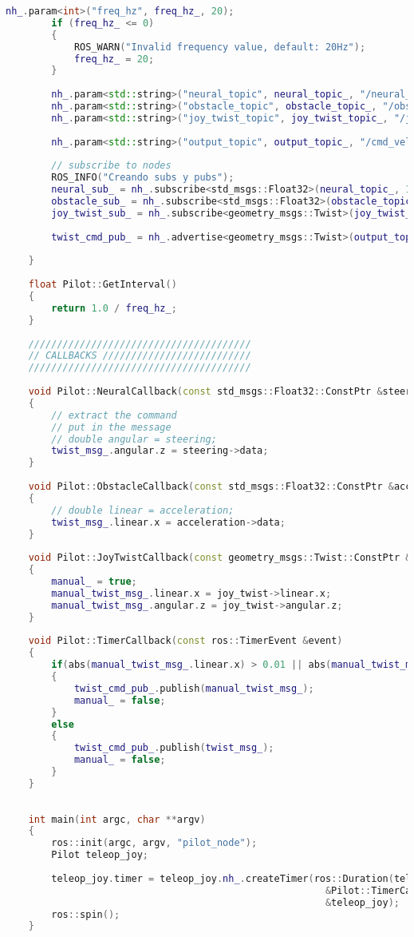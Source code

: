 \begin{lstlisting}[title={pilot\_node.cpp},language=c++]
        nh_.param<int>("freq_hz", freq_hz_, 20);
        if (freq_hz_ <= 0)
        {
            ROS_WARN("Invalid frequency value, default: 20Hz");
            freq_hz_ = 20;
        }
    
        nh_.param<std::string>("neural_topic", neural_topic_, "/neural_output");
        nh_.param<std::string>("obstacle_topic", obstacle_topic_, "/obstacle_output");
        nh_.param<std::string>("joy_twist_topic", joy_twist_topic_, "/joy_cmd_vel");
    
        nh_.param<std::string>("output_topic", output_topic_, "/cmd_vel");
        
        // subscribe to nodes
        ROS_INFO("Creando subs y pubs");
        neural_sub_ = nh_.subscribe<std_msgs::Float32>(neural_topic_, 1, &Pilot::NeuralCallback, this);
        obstacle_sub_ = nh_.subscribe<std_msgs::Float32>(obstacle_topic_, 1, &Pilot::ObstacleCallback, this);
        joy_twist_sub_ = nh_.subscribe<geometry_msgs::Twist>(joy_twist_topic_, 1, &Pilot::JoyTwistCallback, this);
    
        twist_cmd_pub_ = nh_.advertise<geometry_msgs::Twist>(output_topic_, 1);
    
    }
    
    float Pilot::GetInterval()
    {
        return 1.0 / freq_hz_;
    }
    
    ///////////////////////////////////////
    // CALLBACKS //////////////////////////
    ///////////////////////////////////////
    
    void Pilot::NeuralCallback(const std_msgs::Float32::ConstPtr &steering)
    {
        // extract the command
        // put in the message
        // double angular = steering;
        twist_msg_.angular.z = steering->data;
    }
    
    void Pilot::ObstacleCallback(const std_msgs::Float32::ConstPtr &acceleration)
    {
        // double linear = acceleration;
        twist_msg_.linear.x = acceleration->data;
    }
    
    void Pilot::JoyTwistCallback(const geometry_msgs::Twist::ConstPtr &joy_twist)
    {
        manual_ = true;
        manual_twist_msg_.linear.x = joy_twist->linear.x;
        manual_twist_msg_.angular.z = joy_twist->angular.z;
    }
    
    void Pilot::TimerCallback(const ros::TimerEvent &event)
    {
        if(abs(manual_twist_msg_.linear.x) > 0.01 || abs(manual_twist_msg_.angular.z) > 0.01)
        {
            twist_cmd_pub_.publish(manual_twist_msg_);
            manual_ = false;
        }
        else
        {
            twist_cmd_pub_.publish(twist_msg_);
            manual_ = false;
        }
    }
    
    
    int main(int argc, char **argv)
    {
        ros::init(argc, argv, "pilot_node");
        Pilot teleop_joy;
    
        teleop_joy.timer = teleop_joy.nh_.createTimer(ros::Duration(teleop_joy.GetInterval()),
                                                        &Pilot::TimerCallback,
                                                        &teleop_joy);
        ros::spin();
    }
\end{lstlisting}

